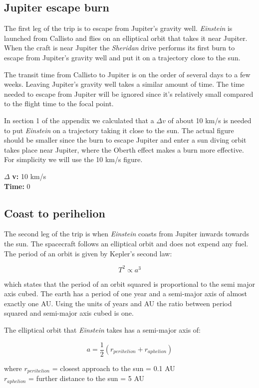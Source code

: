 \documentclass[12pt]{article} %
\begin{document}
\subsection{Jupiter escape burn}
The first leg of the trip is to escape from Jupiter's gravity well. \textit{Einstein} is launched from Callisto and flies on an elliptical orbit that takes it near Jupiter. When the craft is near Jupiter the \textit{Sheridan} drive performs its first burn to escape from Jupiter's gravity well and put it on a trajectory close to the sun.

The transit time from Callisto to Jupiter is on the order of several days to a few weeks. Leaving Jupiter's gravity well takes a similar amount of time. The time needed to escape from Jupiter will be ignored since it's relatively small compared to the flight time to the focal point.

In section 1 of the appendix we calculated that a $\Delta v$ of about 10 km/s is needed to put \textit{Einstein} on a trajectory taking it close to the sun. The actual figure should be smaller since the burn to escape Jupiter and enter a sun diving orbit takes place near Jupiter, where the Oberth effect makes a burn more effective. For simplicity we will use the 10 km/s figure.

$\Delta$ \textbf{v:} 10 km/s\\
\textbf{Time:} 0

\subsection{Coast to perihelion}
The second leg of the trip is when \textit{Einstein} coasts from Jupiter inwards towards the sun. The spacecraft follows an elliptical orbit and does not expend any fuel. The period of an orbit is given by Kepler's second law:

$$T^2 \propto a^3$$

which states that the period of an orbit squared is proportional to the semi major axis cubed. The earth has a period of one year and a semi-major axis of almost exactly one AU. Using the units of years and AU the ratio between period squared and semi-major axis cubed is one.

The elliptical orbit that \textit{Einstein} takes has a semi-major axis of:

$$a = \frac{1}{2}(r_{perihelion} + r_{aphelion})$$

where
$r_{perihelion}$ = closest approach to the sun = 0.1 AU\\
$r_{aphelion}$ = further distance to the sun = 5 AU\\
\end{document}
